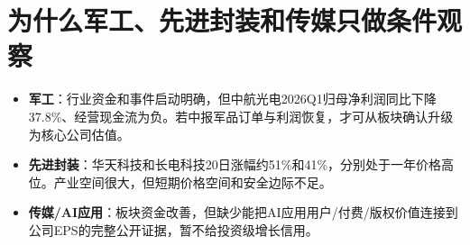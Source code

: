 \section{为什么军工、先进封装和传媒只做条件观察}

\begin{itemize}
  \item \textbf{军工}：行业资金和事件启动明确，但中航光电2026Q1归母净利润同比下降37.8\%、经营现金流为负。若中报军品订单与利润恢复，才可从板块确认升级为核心公司估值。
  \item \textbf{先进封装}：华天科技和长电科技20日涨幅约51\%和41\%，分别处于一年价格高位。产业空间很大，但短期价格空间和安全边际不足。
  \item \textbf{传媒/AI应用}：板块资金改善，但缺少能把AI应用用户/付费/版权价值连接到公司EPS的完整公开证据，暂不给投资级增长信用。
\end{itemize}
